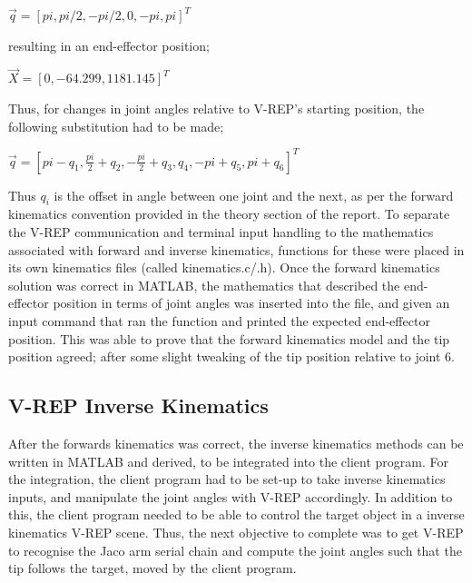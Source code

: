 \documentclass[12pt,openany,a4paper]{book}
\begin{document}
\begin{center}
$\vec{q} = [ pi, pi/2, -pi/2, 0, -pi, pi]^T$
\end{center}
\vspace{\baselineskip}

resulting in an end-effector position;

\vspace{\baselineskip}

\begin{center}
$\vec{X} = [0, -64.299, 1181.145]^T$
\end{center}
\vspace{\baselineskip}

Thus, for changes in joint angles relative to V-REP's starting position, the following substitution had to be made;

\vspace{\baselineskip}

\begin{center}
$\vec{q} = [ pi - q_1, \frac{pi}{2} + q_2, -\frac{pi}{2} + q_3, q_4, -pi + q_5, pi + q_6]^T$
\end{center}
\vspace{\baselineskip}

Thus $q_i$ is the offset in angle between one joint and the next, as per the forward kinematics convention provided in the theory section of the report. To separate the V-REP communication and terminal input handling to the mathematics associated with forward and inverse kinematics, functions for these were placed in its own kinematics files (called kinematics.c/.h). Once the forward kinematics solution was correct in MATLAB, the mathematics that described the end-effector position in terms of joint angles was inserted into the file, and given an input command that ran the function and printed the expected end-effector position. This was able to prove that the forward kinematics model and the tip position agreed; after some slight tweaking of the tip position relative to joint 6.


\subsection{V-REP Inverse Kinematics}
After the forwards kinematics was correct, the inverse kinematics methods can be written in MATLAB and derived, to be integrated into the client program. For the integration, the client program had to be set-up to take inverse kinematics inputs, and manipulate the joint angles with V-REP accordingly. In addition to this, the client program needed to be able to control the target object in a inverse kinematics V-REP scene. Thus, the next objective to complete was to get V-REP to recognise the Jaco arm serial chain and compute the joint angles such that the tip follows the target, moved by the client program.
\end{document}
